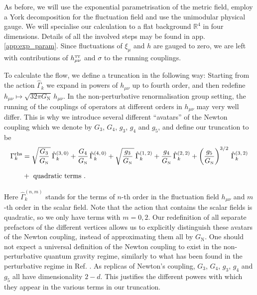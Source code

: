 \documentclass[11pt]{book}
\newcommand\TTspace{ -1pt }
\newcommand\hTTmunu{ h^{\scriptscriptstyle{\mathrm{T\hspace{\TTspace}T}}}_{\mu\nu} }
\newcommand\GNewton{ G_{\scriptscriptstyle{\mathrm{N}}}{} }
\numberwithin{equation}{chapter}
\begin{document}
As before, we will use the exponential parametrisation of the metric field,
employ a York decomposition for the fluctuation field and use the unimodular physical gauge.
We will specialise our calculation to a flat background $\mathbb R^4$ in four dimensions.
Details of all the involved steps may be found in app. \ref{app:exp_param}.
Since fluctuations of $\xi_\mu$ and $h$ are gauged to zero,
we are left with contributions of $\hTTmunu$ and $\sigma$ to the running couplings.

To calculate the flow, we define a truncation in the following way:
Starting from the action $\hat\Gamma_k$ we expand in powers of $h_{\mu \nu}$ up to fourth order,
and then redefine $h_{\mu \nu} \mapsto \sqrt{32 \pi \GNewton} \, h_{\mu\nu}$.
In the non-perturbative renormalisation group setting,
the running of the couplings of operators at different orders in $h_{\mu \nu}$ may very well differ.
This is why we introduce several different ``avatars'' of the Newton coupling which we denote
by $G_3$, $G_4$, $g_3$, $g_4$ and $g_5$, and define our truncation to be
\begin{align}
  \Gamma_k^\mathrm{rhs} &=
  \sqrt{ \frac{G_3}{\GNewton} \, } \, \hat\Gamma^{(3,\,0)}_k
  + \frac{G_4}{\GNewton} \, \hat\Gamma^{(4,\,0)}_k
  + \sqrt{ \frac{g_3}{\GNewton} \, } \, \hat\Gamma^{(1,\,2)}_k
  + \frac{g_4}{ \GNewton} \, \hat\Gamma^{(2,\,2)}_k
  + \left(\frac{g_5}{ \GNewton}\right)^{3/2} \, \hat\Gamma^{(3,\,2)}_k \nonumber \\
  & + \vphantom{ \sqrt{\frac{g_3}{\GNewton}} }\mbox{ quadratic terms }.
  \label{gammarhs}
\end{align}
Here $\hat \Gamma^{(n,m)}_k$ stands for the terms of $n$-th order in the fluctuation field $h_{\mu \nu}$
and $m$-th order in the scalar field.
Note that the action that contains the scalar fields is quadratic,
so we only have terms with $m=0,2$.
Our redefinition of all separate prefactors of the different vertices allows us to explicitly distinguish
these avatars of the Newton coupling, instead of approximating them all by $\GNewton$.
One should not expect a universal definition of the Newton coupling to exist in the non-perturbative
quantum gravity regime, similarly to what has been found in the perturbative regime in
Ref. \cite{Anber:2011ut}.
As replicas of Newton's coupling, $G_3$, $G_4$, $g_3$, $g_4$ and $g_5$ all have dimensionality $2-d$.
This justifies the different powers with which they appear
in the various terms in our truncation.
\end{document}
